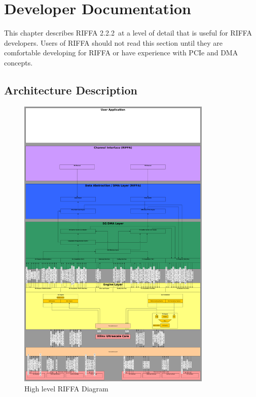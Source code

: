 \documentclass{refrep}
\newcommand{\RIFFAVer}{2.2.2}
\begin{document}
\chapter{Developer Documentation}
This chapter describes RIFFA \RIFFAVer~at a level of detail that is useful for
RIFFA developers. Users of RIFFA should not read this section until they are
comfortable developing for RIFFA or have experience with PCIe and DMA
concepts. 
\section{Architecture Description}
\begin{figure}[H]
\includegraphics[width=350px,center]{RIFFA.pdf}
  \caption{High level RIFFA Diagram}
  \label{Fig:Developer:HighLevel:Full}
\end{figure}
\end{document}

